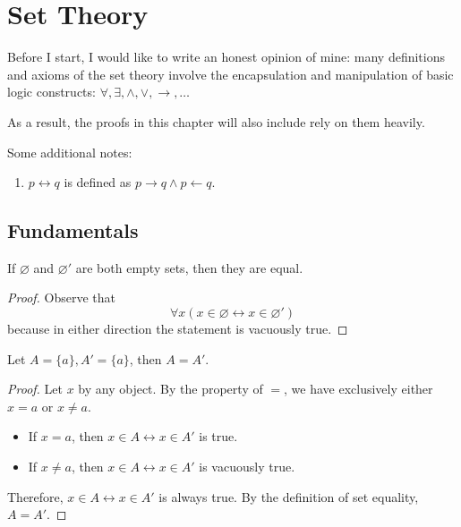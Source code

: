 
\chapter{Set Theory}
Before I start, I would like to write an honest opinion of mine: many definitions and axioms of the set theory involve the encapsulation and manipulation of basic logic constructs: $\forall, \exists, \wedge, \vee, \to, \dots$

As a result, the proofs in this chapter will also include rely on them heavily.

Some additional notes:
\begin{enumerate}
	\item $p \leftrightarrow q$ is defined as $p \to q \wedge p \leftarrow q$.
\end{enumerate}

\section{Fundamentals}
\begin{why}{29}\label{why.unique.empty.set}
If $\varnothing$ and $\varnothing'$ are both empty sets, then they are equal.
\end{why}
\begin{proof}
	Observe that 
	\[
	\forall x (x \in \varnothing \leftrightarrow x \in \varnothing')
	\]
	because in either direction the statement is vacuously true.
\end{proof}

\begin{why}{30}\label{why.eq.singleton.sets}
	Let $A = \{a\}, A' = \{a\}$, then $A = A'$.
\end{why}
\begin{proof}
	Let $x$ by any object. By the property of $=$, we have exclusively either $x=a$ or $x \ne a$.
	
	\begin{itemize}
		\item If $x = a$, then $x \in A \leftrightarrow x \in A'$ is true.
		\item If $x \ne a$, then $x \in A \leftrightarrow x \in A'$ is vacuously true.		
	\end{itemize}

	Therefore, $x \in A \leftrightarrow x \in A'$ is always true. By the definition of set equality, $A = A'$.
\end{proof}


